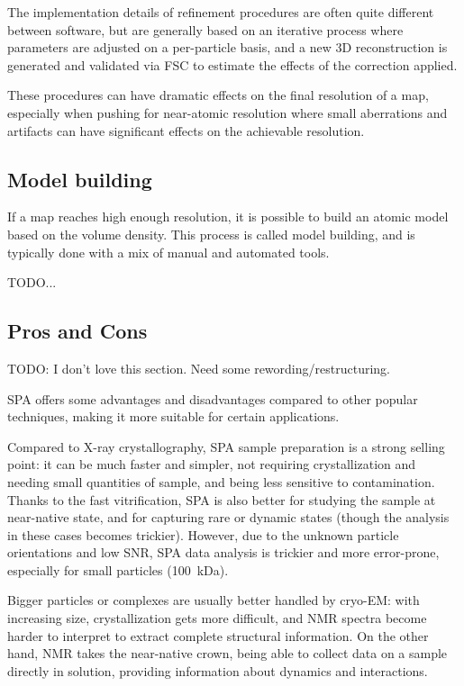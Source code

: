 The implementation details of refinement procedures are often quite different between software, but are generally based on an iterative process where parameters are adjusted on a per-particle basis, and a new 3D reconstruction is generated and validated via FSC to estimate the effects of the correction applied.

These procedures can have dramatic effects on the final resolution of a map, especially when pushing for near-atomic resolution where small aberrations and artifacts can have significant effects on the achievable resolution.

\subsection{Model building}

If a map reaches high enough resolution, it is possible to build an atomic model based on the volume density.
This process is called model building, and is typically done with a mix of manual and automated tools.

TODO...

\subsection{Pros and Cons}

TODO: I don't love this section. Need some rewording/restructuring.

SPA offers some advantages and disadvantages compared to other popular techniques, making it more suitable for certain applications.

Compared to X-ray crystallography, SPA sample preparation is a strong selling point: it can be much faster and simpler, not requiring crystallization and needing small quantities of sample, and being less sensitive to contamination.
Thanks to the fast vitrification, SPA is also better for studying the sample at near-native state, and for capturing rare or dynamic states (though the analysis in these cases becomes trickier).
However, due to the unknown particle orientations and low SNR, SPA data analysis is trickier and more error-prone, especially for small particles (\lesssim\qty{100}{\kilo\dalton}).

Bigger particles or complexes are usually better handled by cryo-EM: with increasing size, crystallization gets more difficult, and NMR spectra become harder to interpret to extract complete structural information.
On the other hand, NMR takes the near-native crown, being able to collect data on a sample directly in solution, providing information about dynamics and interactions.

